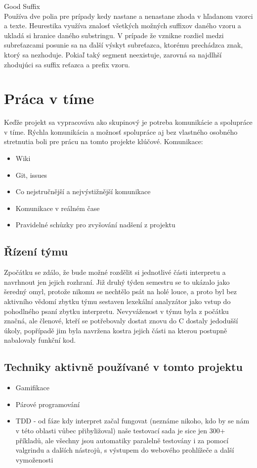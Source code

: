 \documentclass[a4paper]{article}
\begin{document}
Good Suffix\\
Používa dve polia pre prípady kedy nastane a nenastane zhoda v hľadanom vzorci a texte. Heurestika využíva znalosť všetkých možných suffixov daného vzoru a ukladá si hranice daného substringu. V prípade že vznikne rozdiel medzi subreťazcami posunie sa na ďalší výskyt subreťazca, ktorému prechádzca znak, ktorý sa nezhoduje. Pokiaľ taký segment neexistuje, zarovná sa najdlhší zhodujúci sa suffix reťazca a prefix vzoru.

\section{Práca v tíme}
Keďže projekt sa vypracováva ako skupinový je potreba komunikácie a spolupráce v tíme. Rýchla komunikácia a možnosť spolupráce aj bez vlastného osobného stretnutia boli pre prácu na tomto projekte klúčové.
Komunikace:
\begin{itemize}
	\item Wiki
	\item Git, issues
	\item Co nejstručnější a nejvýstižnější komunikace
	\item Komunikace v reálném čase
	\item Pravidelné schůzky pro zvyšování nadšení z projektu	
\end{itemize}

\subsection{Řízení týmu}
Zpočátku se zdálo, že bude možné rozdělit si jednotlivé části interpretu a navrhnout jen jejich rozhraní. Již druhý týden semestru se to ukázalo jako šeredný omyl, protože nikomu se nechtělo psát na holé louce, a proto byl bez aktivního vědomí zbytku týmu sestaven lexekální analyzátor jako vstup do pohodlného psaní zbytku interpretu. Nevyváženost v týmu byla z počátku značná, ale členové, kteří se potřebovaly dostat znovu do C dostaly jedodušší úkoly, popřípadě jim byla navržena kostra jejich části na kterou postupně nabalovaly funkční kod.

\subsection{Techniky aktivně používané v tomto projektu}
\begin{itemize}
	\item Gamifikace
	\item Párové programování
	\item TDD - od fáze kdy interpret začal fungovat (neznáme nikoho, kdo by se nám v této oblasti vůbec přibyližoval) naše testovací sada je sice jen 300+ příkladů, ale všechny jsou automatiky paralelně testovány i za pomocí valgrindu a dalších nástrojů, s výstupem do webového prohlížeče a další vymoženosti
\end{itemize}
\end{document}
